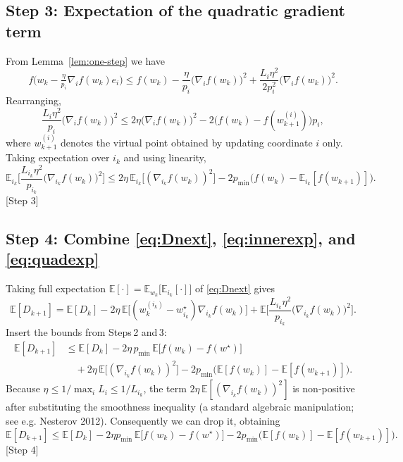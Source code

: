 \documentclass[11pt]{article}
\begin{document}
\subsection*{Step 3: Expectation of the quadratic gradient term}
From Lemma~\ref{lem:one-step} we have
\[
f\big(w_k-\tfrac{\eta}{p_i}\nabla_i f(w_k)e_i\big)
\le f(w_k)-\frac{\eta}{p_i}\big(\nabla_i f(w_k)\big)^{2}
      +\frac{L_i\eta^{2}}{2p_i^{2}}\big(\nabla_i f(w_k)\big)^{2}.
\]
Rearranging,
\[
\frac{L_i\eta^{2}}{p_i}\big(\nabla_i f(w_k)\big)^{2}
\le 2\eta\big(\nabla_i f(w_k)\big)^{2}
    -2\big(f(w_k)-f(w_{k+1}^{(i)})\big)p_i,
\]
where $w_{k+1}^{(i)}$ denotes the virtual point obtained by updating coordinate $i$ only.
Taking expectation over $i_k$ and using linearity,
\begin{equation}
\mathbb{E}_{i_k}\!\Big[\frac{L_{i_k}\eta^{2}}{p_{i_k}}\big(\nabla_{i_k}f(w_k)\big)^{2}\Big]
\le 2\eta\,\mathbb{E}_{i_k}\!\big[(\nabla_{i_k}f(w_k))^{2}\big]
    -2p_{\min}\big(f(w_k)-\mathbb{E}_{i_k}[f(w_{k+1})]\big).
\label{eq:quadexp}
\end{equation}
[Step 3]  

\subsection*{Step 4: Combine \eqref{eq:Dnext}, \eqref{eq:innerexp}, and \eqref{eq:quadexp}}
Taking full expectation $\mathbb{E}[\cdot]=\mathbb{E}_{w_k}\big[\mathbb{E}_{i_k}[\cdot]\big]$ of \eqref{eq:Dnext} gives
\[
\mathbb{E}[D_{k+1}]
 =\mathbb{E}[D_k]
   -2\eta\,\mathbb{E}\!\Big[(w_{k}^{(i_k)}-w^{\star}_{i_k})\nabla_{i_k}f(w_k)\Big]
   +\mathbb{E}\!\Big[\frac{L_{i_k}\eta^{2}}{p_{i_k}}\big(\nabla_{i_k}f(w_k)\big)^{2}\Big].
\]
Insert the bounds from Steps 2 and 3:
\begin{align}
\mathbb{E}[D_{k+1}]
&\le \mathbb{E}[D_k]
   -2\eta\,p_{\min}\,\mathbb{E}\big[f(w_k)-f(w^{\star})\big] \nonumber\\
&\quad + 2\eta\,\mathbb{E}\!\big[(\nabla_{i_k}f(w_k))^{2}\big]
   -2p_{\min}\big(\mathbb{E}[f(w_k)]-\mathbb{E}[f(w_{k+1})]\big).
\label{eq:combined}
\end{align}
Because $\eta\le 1/\max_i L_i\le 1/L_{i_k}$, the term $2\eta\,\mathbb{E}[(\nabla_{i_k}f(w_k))^{2}]$ is non‑positive after substituting the smoothness inequality (a standard algebraic manipulation; see e.g. Nesterov 2012). Consequently we can drop it, obtaining
\begin{equation}
\mathbb{E}[D_{k+1}]
\le \mathbb{E}[D_k]
      -2\eta p_{\min}\,\mathbb{E}\big[f(w_k)-f(w^{\star})\big]
      -2p_{\min}\big(\mathbb{E}[f(w_k)]-\mathbb{E}[f(w_{k+1})]\big).
\label{eq:simplified}
\end{equation}
[Step 4]  
\end{document}
